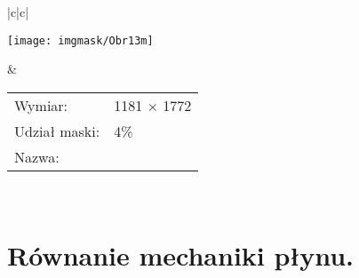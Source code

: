 \documentclass[12pt, twoside, openany]{report}
\theoremstyle{definition}
\begin{document}
\begin{longtable}[h!]{|c|c|}
    \begin{minipage}{.65\textwidth}
    \vspace{0.2cm}
    \centering
    \texttt{[image: imgmask/Obr13m]}
    \vspace{0.2cm}
    \end{minipage}
    &
    \begin{minipage}{.35\textwidth}
    \begin{tabular}{ l l  }
	Wymiar: & 1181 $\times$ 1772 \\
	Udział maski: & 4\% \\
	Nazwa: & \ObrXIIIm
    \end{tabular}
    \end{minipage} \\ \hline
    \caption{Obrazy poddane analizie.}
  \label{imgmasks}
\end{longtable}
\section{Równanie mechaniki płynu.}
\label{sec:NVResult}
\end{document}
